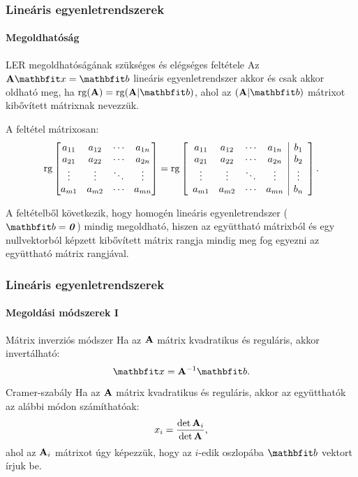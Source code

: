 \begin{frame}
  \frametitle{Lineáris egyenletrendszerek}
  \framesubtitle{Megoldhatóság}

  \begin{block}{LER megoldhatóságának szükséges és elégséges feltétele}
    Az $\rmat A \rvec x = \rvec b$ lineáris egyenletrendszer akkor és csak
    akkor oldható meg, ha $\rg(\rmat A) = \rg(\rmat A | \rvec b)$, ahol az
    $(\rmat A | \rvec b)$ mátrixot kibővített mátrixnak nevezzük.

    A feltétel mátrixosan:
    \[
      \operatorname{rg} \begin{bmatrix}
        a_{11} & a_{12} & \cdots & a_{1n} \\
        a_{21} & a_{22} & \cdots & a_{2n} \\
        \vdots & \vdots & \ddots & \vdots \\
        a_{m1} & a_{m2} & \cdots & a_{mn}
      \end{bmatrix} = \operatorname{rg} \left[\begin{array}{cccc|c}
          a_{11} & a_{12} & \cdots & a_{1n} & b_1    \\
          a_{21} & a_{22} & \cdots & a_{2n} & b_2    \\
          \vdots & \vdots & \ddots & \vdots & \vdots \\
          a_{m1} & a_{m2} & \cdots & a_{mn} & b_n
        \end{array}\right]\text.
    \]

    A feltételből következik, hogy homogén lineáris egyenletrendszer
    ($\rvec b = \nvec$) mindig megoldható, hiszen az együttható mátrixból és egy
    nullvektorból képzett kibővített mátrix rangja mindig meg fog egyezni az
    együttható mátrix rangjával.
  \end{block}
\end{frame}

\begin{frame}
  \frametitle{Lineáris egyenletrendszerek}
  \framesubtitle{Megoldási módszerek I}

  \begin{block}{Mátrix inverziós módszer}
    Ha az $\mathbf{A}$ mátrix kvadratikus és reguláris, akkor invertálható:
    \[
      \rvec x = \rmat A^{-1} \rvec b
      \text.
    \]
  \end{block}

  \begin{block}{Cramer-szabály}
    Ha az $\mathbf{A}$ mátrix kvadratikus és reguláris, akkor az együtthatók az
    alábbi módon számíthatóak:
    \[
      x_i = \frac{\det \mathbf{A}_i}{\det \mathbf{A}}
      \text,
    \]
    ahol az $\mathbf{A}_i$ mátrixot úgy képezzük, hogy az $i$-edik oszlopába
    $\rvec b$ vektort írjuk be.
  \end{block}
\end{frame}

